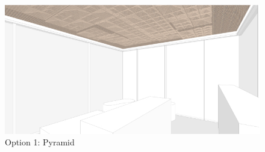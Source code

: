 ﻿%
\begin{figure}[H]
	\centering
	\includegraphics[width=\linewidth]{src/graphics/rattan-charm--pattern-generation-opt-01-pyramid-perspective.jpg}
	\caption*{%
		Option 1: Pyramid
	}
	\label{
		fig:rattan-charm--pattern-generation-opt-01-pyramid-perspective
	}
\end{figure}
